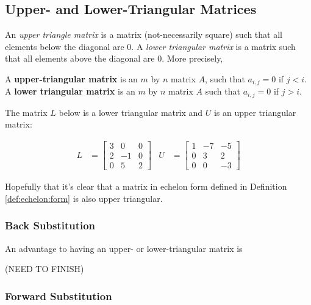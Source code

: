 \subsection{Upper- and Lower-Triangular Matrices}

An \emph{upper triangle matrix} is a matrix (not-necessarily square) such that all elements below the diagonal are 0.  A \emph{lower triangular matrix} is a matrix such that all elements above the diagonal are 0.  More precisely,

\begin{definition}
A \textbf{upper-triangular matrix} is an $m$ by $n$ matrix $A$, such that $a_{i,j}=0$ if $j<i$.  A \textbf{lower triangular matrix} is an $m$ by $n$ matrix $A$ such that $a_{i,j}=0$ if $j>i$.  
\end{definition}

\begin{example}
The matrix $L$ below is a lower triangular matrix and $U$ is an upper triangular matrix:

\begin{align*}
L & = \begin{bmatrix}
3 & 0 & 0 \\
2 & -1 & 0 \\
0 & 5 & 2
\end{bmatrix} & 
U & = \begin{bmatrix}
1 & -7 & -5 \\
0 & 3 & 2 \\
0 & 0 & -3 
\end{bmatrix}
\end{align*}
\end{example}

Hopefully that it's clear that a matrix in echelon form defined in Definition \ref{def:echelon:form} is also upper triangular.  


\subsubsection{Back Substitution}

An advantage to having an upper- or lower-triangular matrix is 


{\color{red} (NEED TO FINISH)}

\subsubsection{Forward Substitution}

